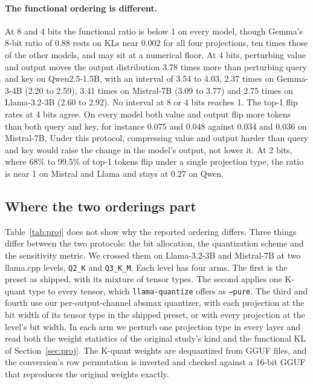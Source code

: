 \documentclass[10pt]{article}
\begin{document}
\paragraph{The functional ordering is different.} At 8 and 4 bits the functional ratio is below
1 on every model, though Gemma's 8-bit ratio of 0.88 rests on KLs near $0.002$ for all four
projections, ten times those of the other models, and may sit at a numerical floor. At 4 bits, perturbing value and output moves the output distribution 3.78
times more than perturbing query and key on Qwen2.5-1.5B, with an interval of 3.54 to 4.03,
2.37 times on Gemma-3-4B (2.20 to 2.59), 3.41 times on Mistral-7B (3.09 to 3.77) and 2.75 times
on Llama-3.2-3B (2.60 to 2.92). No interval at 8 or 4 bits reaches 1. The top-1 flip rates at 4 bits agree. On every
model both value and output flip more tokens than both query and key, for instance 0.075 and
0.048 against 0.034 and 0.036 on Mistral-7B. Under this protocol, compressing value and output
harder than query and key would raise the change in the model's output, not lower it. At 2 bits,
where 68\% to 99.5\% of top-1 tokens flip under a single projection type, the ratio is near 1 on
Mistral and Llama and stays at 0.27 on Qwen.

\subsection{Where the two orderings part}\label{sec:proj:factorial}

Table~\ref{tab:proj} does not show why the reported ordering differs. Three things differ
between the two protocols: the bit allocation, the quantization scheme and the sensitivity
metric. We crossed them on Llama-3.2-3B and Mistral-7B at two llama.cpp levels, \texttt{Q2\_K}
and \texttt{Q3\_K\_M}. Each level has four arms. The first is the preset as shipped, with its
mixture of tensor types. The second applies one K-quant type to every tensor, which
\texttt{llama-quantize} offers as \texttt{--pure}. The third and fourth use our per-output-channel
absmax quantizer, with each projection at the bit width of its tensor type in the shipped preset,
or with every projection at the level's bit width. In each arm we perturb one projection type in
every layer and read both the weight statistics of the original study's kind and the functional
KL of Section~\ref{sec:proj}. The K-quant weights are dequantized from GGUF files, and the
conversion's row permutation is inverted and checked against a 16-bit GGUF that reproduces the
original weights exactly.
\end{document}
